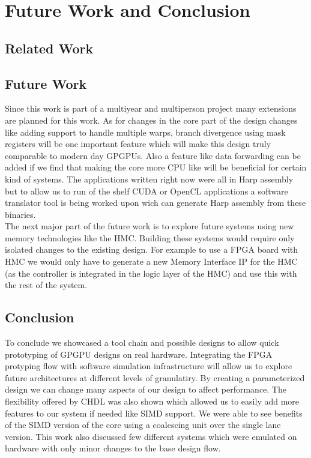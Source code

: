 \setcounter{equation}{0}

\chapter{Future Work and Conclusion }
\label{Future Work and Conclusion }
\section{Related Work}
 
\section{Future Work}
Since this work is part of a multiyear and multiperson project many extensions are planned for this work. As for changes in the core part of the design changes like adding support to handle multiple warps, branch divergence using mask registers will be one important feature which will make this design truly comparable to modern day GPGPUs. Also a feature like data forwarding can be added if we find that making the core more CPU like will be beneficial for certain kind of systems.
The applications written right now were all in Harp assembly but to allow us to run of the shelf CUDA or OpenCL applications a software translator tool is being worked upon wich can generate Harp assembly from these binaries.\\
The next major part of the future work is to explore future systems using new memory technologies like the HMC. Building these systems would require only isolated changes to the existing design. For example to use a FPGA board with HMC we would only have to generate a new Memory Interface IP for the HMC (as the controller is integrated in the logic layer of the HMC) and use this with the rest of the system.\\
\section{Conclusion}
To conclude we showcased a tool chain and possible designs to allow quick prototyping of GPGPU designs on real hardware. Integrating the FPGA protyping flow with software simulation infrastructure will allow us to explore future architectures at different levels of granulatiry. By creating a parameterized design we can change many aspects of our design to affect performance. The flexibility offered by CHDL was also shown which allowed us to easily add more features to our system if needed like SIMD support. We were able to see benefits of the SIMD version of the core using a coalescing unit over the single lane version. This work also discussed few different systems which were emulated on hardware with only minor changes to the base design flow. 
